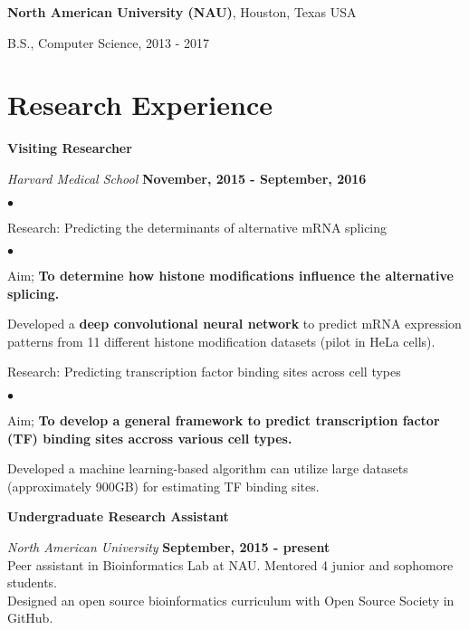 \documentclass[margin,line]{res}
\newenvironment{list1}{
  \begin{list}{\ding{113}}{%
      \setlength{\itemsep}{0in}
      \setlength{\parsep}{0in} \setlength{\parskip}{0in}
      \setlength{\topsep}{0in} \setlength{\partopsep}{0in} 
      \setlength{\leftmargin}{0.17in}}}{\end{list}}
\newenvironment{list2}{
  \begin{list}{$\bullet$}{%
      \setlength{\itemsep}{0in}
      \setlength{\parsep}{0in} \setlength{\parskip}{0in}
      \setlength{\topsep}{0in} \setlength{\partopsep}{0in} 
      \setlength{\leftmargin}{0.2in}}}{\end{list}}
\begin{document}
\begin{resume}
{\bf North American University (NAU)}, Houston, Texas USA\\
\vspace*{-.1in}
\begin{list1}
\item[] B.S., Computer Science,  2013 - 2017
\end{list1}


\section{\sc Research Experience}

{\bf Visiting Researcher}

\vspace{-.3cm}
{\em Harvard Medical School} \hfill {\bf November, 2015 - September, 2016}\\
\vspace{-.3cm}
\begin{list2}
\item Research: Predicting the determinants of alternative mRNA splicing
\begin{list2}
\item Aim; {\bf To determine how histone modifications influence the alternative splicing.}
\item Developed a {\bf deep convolutional neural network} to predict mRNA expression patterns from 11 different histone modification datasets (pilot in HeLa cells).

\end{list2}
\item Research: Predicting transcription factor binding sites across cell types
\begin{list2}
\item Aim; {\bf To develop a general framework to predict transcription factor (TF) binding sites accross various cell types.}
\item Developed a machine learning-based algorithm can utilize large datasets (approximately 900GB) for estimating TF binding sites.
\end{list2}
\end{list2}

{\bf Undergraduate Research Assistant}

\vspace{-.3cm}
{\em North American University} \hfill {\bf September, 2015 - present}\\
Peer assistant in Bioinformatics Lab at NAU. Mentored 4 junior and sophomore students.\\
Designed an open source bioinformatics curriculum with Open Source Society in GitHub.


\end{resume}
\end{document}
